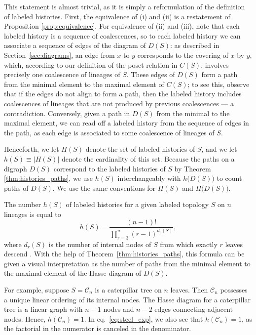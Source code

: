 \documentclass[10pt]{article}
\begin{document}
This statement is almost trivial, as it is simply a reformulation of the definition of labeled histories. First, the equivalence of (i) and (ii) is a restatement of Proposition \ref{prop:equivalence}. For equivalence of (ii) and (iii), note that each labeled history is a sequence of coalescences, so to each labeled history we can associate a sequence of edges of the diagram of $D(S)$: as described in Section~\ref{sec:diagrams}, an edge from $x$ to $y$ corresponds to the covering of $x$ by $y$, which, according to our definition of the poset relation in $C(S)$, involves precisely one coalescence of lineages of $S$. These edges of $D(S)$ form a path from the minimal element to the maximal element of $C(S)$; to see this, observe that if the edges do not align to form a path, then the labeled history includes coalescences of lineages that are not produced by previous coalescences --- a contradiction. Conversely, given a path in $D(S)$ from the minimal to the maximal element, we can read off a labeled history from the sequence of edges in the path, as each edge is associated to some coalescence of lineages of $S$.

Henceforth, we let $H(S)$ denote the set of labeled histories of $S$, and we let $h(S)\equiv|H(S)|$ denote the cardinality of this set. Because the paths on a digraph $D(S)$ correspond to the labeled histories of $S$ by Theorem \ref{thm:histories_paths}, we use $h(S)$ interchangeably with $h\big(D(S)\big)$ to count paths of $D(S)$. We use the same conventions for $H(S)$ and $H\big(D(S)\big)$.

The number $h(S)$ of labeled histories for a given labeled topology $S$ on $n$ lineages is equal to
\begin{equation}
\label{eq:steel_exp}
	h(S) = \frac{(n-1)!}{\prod_{r = 3}^n (r-1)^{d_r(S)}},
\end{equation}
where $d_r(S)$ is the number of internal nodes of $S$ from which exactly $r$ leaves descend \citep[][page 46]{steel2016phylogeny}. With the help of Theorem~\ref{thm:histories_paths}, this formula can be given a visual interpretation as the number of paths from the minimal element to the maximal element of the Hasse diagram of $D(S)$. 

For example, suppose $S = \mathcal{C}_n$ is a caterpillar tree on $n$ leaves. Then $\mathcal C_n$ possesses a unique linear ordering of its internal nodes. The Hasse diagram for a caterpillar tree is a linear graph with $n-1$ nodes and $n-2$ edges connecting adjacent nodes. Hence, $h(\mathcal C_n) = 1$. In eq.~\ref{eq:steel_exp}, we also see that $h(\mathcal C_n)=1$, as the factorial in the numerator is canceled in the denominator.
\end{document}
